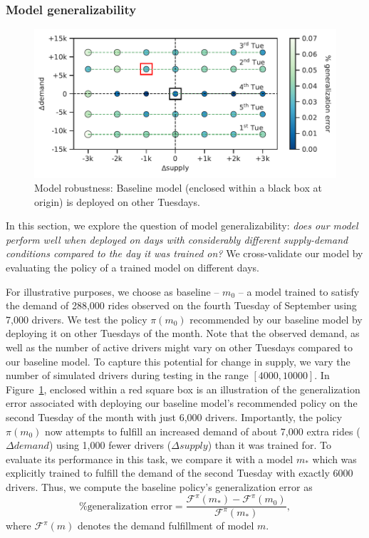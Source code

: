 \subsubsection{Model generalizability}
\label{sec:model_generalizability}
\begin{figure}
	\centering
    \includegraphics[scale=0.5]{figures/model_generalizability_2.pdf} 
    \caption{Model robustness: Baseline model 
    (enclosed within a black box at origin) is 
    deployed on other Tuesdays.} 
	\label{fig:model_generalizability}
\end{figure}
In this section, we explore the question of model generalizability: 
    \textit{does our
    model perform well when deployed on days with considerably different supply-demand conditions 
compared to the day it was trained on?}
We cross-validate our model by evaluating the policy of a trained model on different days. 


For illustrative purposes, we choose as baseline --
    $m_0$ -- a model
    trained to satisfy the demand of 288,000 rides observed on
    the fourth Tuesday of September using 7,000 drivers. 
We test the policy $\pi(m_0)$ recommended by our 
    baseline model by deploying it on other Tuesdays of the month. 
Note that the observed demand, as well as the number of active drivers might
    vary on other Tuesdays compared to
    our baseline model. 
To capture this potential for change in supply, we vary the number of
    simulated drivers during testing in the range $[4000, 10000]$.
In Figure~\ref{fig:model_generalizability}, enclosed within a red square box is
    an illustration of the generalization error associated with deploying our
    baseline model's recommended policy on the second Tuesday of the month with
    just 6,000 drivers.
Importantly, the policy $\pi(m_0)$ now attempts to fulfill an increased 
    demand of about 7,000 extra rides ($\Delta demand$) using 1,000 fewer drivers 
    ($\Delta supply$) than it was trained for.
To evaluate its performance in this task, we compare it with a model
    $m_*$ which was explicitly trained to fulfill the demand of
    the second Tuesday with exactly 6000 drivers.
Thus, we compute the baseline policy's generalization error as
    \begin{equation*}
        \% \textrm{generalization error} =
        \frac{\mathcal{F}^{\pi}(m_*)-\mathcal{F}^{\pi}(m_0)}
        {\mathcal{F}^{\pi}(m_*)},
    \end{equation*}
    where $\mathcal{F}^{\pi}(m)$ denotes the demand fulfillment of model $m$.

